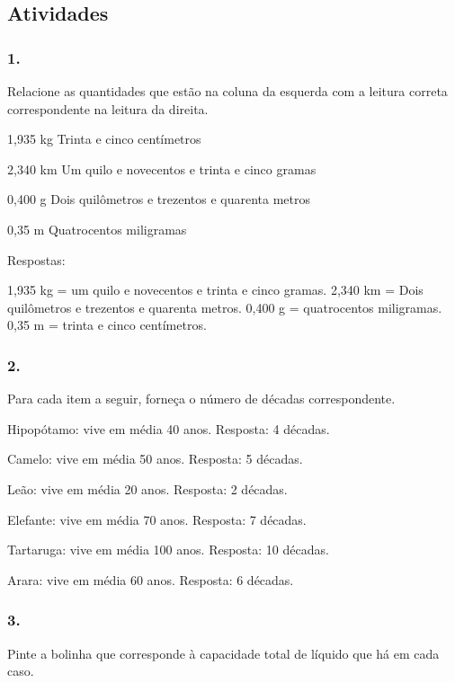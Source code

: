 \begin{enumerate}
\begin{escolha}
\begin{enumerate}
\begin{itemize}
\begin{itemize}
\subsection{Atividades}\label{atividades-3}

\subsubsection{1.}\label{section-39}

Relacione as quantidades que estão na coluna da esquerda com a leitura correta
correspondente na leitura da direita.

1,935 kg Trinta e cinco centímetros

2,340 km Um quilo e novecentos e trinta e cinco gramas

0,400 g Dois quilômetros e trezentos e quarenta metros

0,35 m Quatrocentos miligramas

Respostas:

1,935 kg = um quilo e novecentos e trinta e cinco gramas.
2,340 km = Dois quilômetros e trezentos e quarenta metros.
0,400 g = quatrocentos miligramas.
0,35 m = trinta e cinco centímetros.

\subsubsection{2.}\label{section-40}

Para cada item a seguir, forneça o número de décadas correspondente.

\begin{escolha}
\item Hipopótamo: vive em média 40 anos.
Resposta: 4 décadas.
\item Camelo: vive em média 50 anos.
Resposta: 5 décadas.
\item Leão: vive em média 20 anos.
Resposta: 2 décadas.
\item Elefante: vive em média 70 anos.
Resposta: 7 décadas.
\item Tartaruga: vive em média 100 anos.
Resposta: 10 décadas.
\item Arara: vive em média 60 anos.
Resposta: 6 décadas.


\subsubsection{3.}\label{section-41}

Pinte a bolinha que corresponde à capacidade total de líquido que há em cada caso.


\end{escolha}
\end{itemize}
\end{itemize}
\end{enumerate}
\end{escolha}
\end{enumerate}
